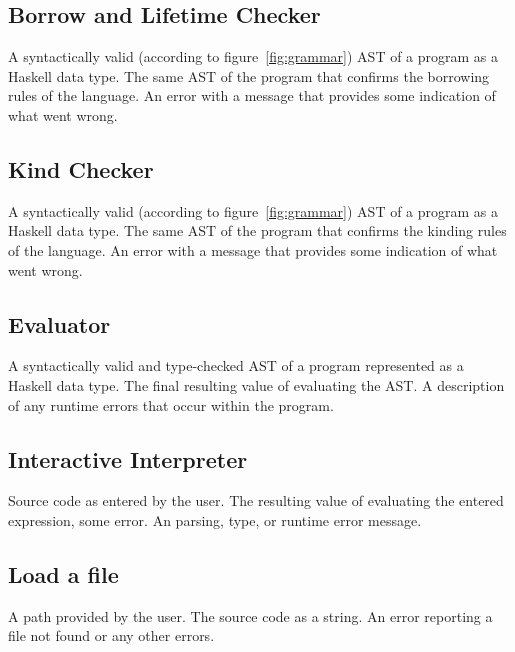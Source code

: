 \subsection{Borrow and Lifetime Checker}\label{sec:borrowcheck}
 {A syntactically
valid (according to figure~\ref{fig:grammar}) AST of a program as a Haskell
data type.} {The same AST of the program that confirms the borrowing rules of
the language.} {An error with a message that provides some indication of what
went wrong.}

\subsection{Kind Checker}\label{sec:kindcheck}
 {A syntactically valid (according to
figure~\ref{fig:grammar}) AST of a program as a Haskell data type.} {The same
AST of the program that confirms the kinding rules of the language.} {An error
with a message that provides some indication of what went wrong.}

\subsection{Evaluator}\label{sec:evaluator}
 {A syntactically valid and type-checked AST of a program
represented as a Haskell data type.} {The final resulting value of evaluating
the AST.} {A description of any runtime errors that occur within the program.}

\subsection{Interactive Interpreter}\label{sec:interpreter}
 {Source code as entered by the user.} {The resulting value of
evaluating the entered expression, some error.} {An parsing, type, or runtime
error message.}

\subsection{Load a file}\label{sec:load}
 {A path provided by the user.} {The source code as a string.} {An error
reporting a file not found or any other errors.}

